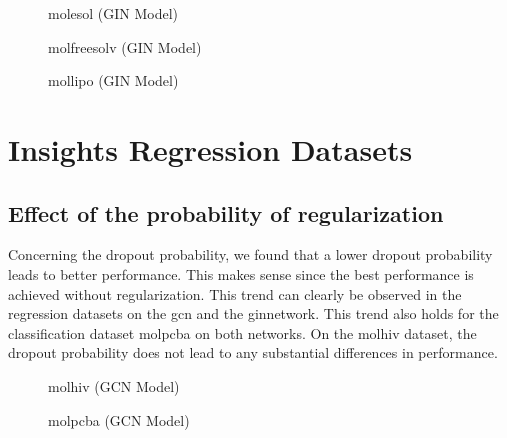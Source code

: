 \begin{figure}
    \centering
    \caption{molesol (GIN Model)}
    \label{fig:gcn-molfreesolv}
\end{figure}

\begin{figure}
    \centering
    \caption{molfreesolv (GIN Model)}
    \label{fig:gcn-molfreesolv}
\end{figure}

\begin{figure}
    \centering
    \caption{mollipo (GIN Model)}
    \label{fig:gcn-molfreesolv}
\end{figure}
\section{Insights Regression Datasets}


\subsection{Effect of the probability of regularization}
Concerning the dropout probability, we found that a lower dropout probability leads to better performance. This makes sense since the best performance is achieved without regularization. This trend can clearly be observed in the regression datasets on the \ac{gcn} and the \ac{gin}network. This trend also holds for the classification dataset molpcba on both networks. On the molhiv dataset, the dropout probability does not lead to any substantial differences in performance.
\begin{figure}
    \centering
    \caption{molhiv (GCN Model)}
    \label{fig:gcn-molfreesolv}
\end{figure}

\begin{figure}
    \centering
    \caption{molpcba (GCN Model)}
    \label{fig:gcn-molfreesolv}
\end{figure}

